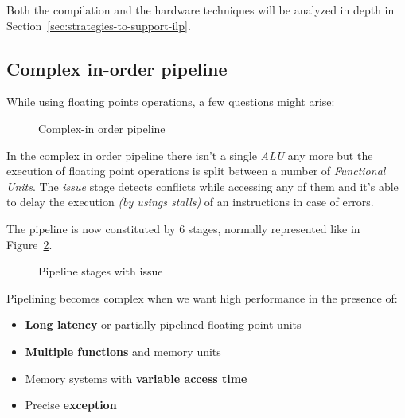 \documentclass[english]{article}
\begin{document}
Both the compilation and the hardware techniques will be analyzed in depth in Section~\ref{sec:strategies-to-support-ilp}.

\subsection{Complex in-order pipeline}

While using floating points operations, a few questions might arise:


\begin{figure}[htbp]
  \bigskip
  \centering
  \caption{Complex-in order pipeline}
  \label{fig:complex-in-order-pipeline}
  \bigskip
\end{figure}

In the complex in order pipeline there isn't a single \textit{ALU} any more but the execution of floating point operations is split between a number of \textit{Functional Units}.
The \textit{issue} stage detects conflicts while accessing any of them and it's able to delay the execution \textit{(by usings stalls)} of an instructions in case of errors.

The pipeline is now constituted by \(6\) stages, normally represented like in Figure~\ref{fig:mips-pipeline-stages-issue}.

\begin{figure}[htbp]
  \bigskip
  \centering
  \caption{Pipeline stages with issue}
  \label{fig:mips-pipeline-stages-issue}
  \bigskip
\end{figure}

Pipelining becomes complex when we want high performance in the presence of:

\begin{itemize}
  \item \textbf{Long latency} or partially pipelined floating point units
  \item \textbf{Multiple functions} and memory units
  \item Memory systems with \textbf{variable access time}
  \item Precise \textbf{exception}
\end{itemize}
\end{document}
